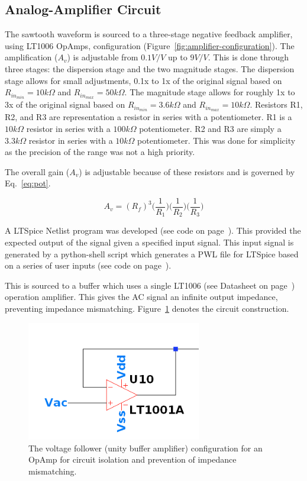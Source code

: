 \documentclass[12pt,journal]{IEEEtran}
\begin{document}
\subsection{Analog-Amplifier Circuit}

The sawtooth waveform is sourced to a three-stage negative feedback amplifier, using LT1006 OpAmps, configuration (Figure~\ref{fig:amplifier-configuration}). The amplification ($A_v$) is adjustable from $0.1 V/V$ up to $9 V/V$. This is done through three stages: the dispersion stage and the two magnitude stages. The dispersion stage allows for small adjustments, 0.1x to 1x of the original signal based on $R_{in_{min}} = 10k\Omega$ and $R_{in_{max}} = 50k\Omega$. The magnitude stage allows for roughly 1x to 3x of the original signal based on  $R_{in_{min}} = 3.6k\Omega$ and $R_{in_{max}} = 10k\Omega$. Resistors R1, R2, and R3 are representation a resistor in series with a potentiometer. R1 is a $10k\Omega$ resistor in series with a $100k\Omega$ potentiometer. R2 and R3 are simply a $3.3k\Omega$ resistor in series with a $10k\Omega$ potentiometer. This was done for simplicity as the precision of the range was not a high priority. 

The overall gain ($A_v$) is adjustable because of these resistors and is governed by Eq.~\ref{eq:pot}.

\begin{equation}
A_v = (R_f)^3\Big(\frac{1}{R_1}\Big)\Big(\frac{1}{R_2}\Big)\Big(\frac{1}{R_3}\Big)
\label{eq:pot}
\end{equation}

A LTSpice Netlist program was developed (see code on page~\pageref{code:ltspice-driver}). This provided the expected output of the signal given a specified input signal. This input signal is generated by a python-shell script which generates a PWL file for LTSpice based on a series of user inputs (see code on page~\pageref{code:pwl-ltspice-python}).

This is sourced to a buffer which uses a single LT1006 (see Datasheet on page~\pageref{datasheet:lt1006}) operation amplifier. This gives the AC signal an infinite output impedance, preventing impedance mismatching. Figure~\ref{fig:buffer} denotes the circuit construction.

\begin{figure}[h!]
  \centering
	\includegraphics[width=3in]{./ltspice/unity-buffer-ltspice.png}
	\caption[Cavity Mounts]{The voltage follower (unity buffer amplifier) configuration for an OpAmp for circuit isolation and prevention of impedance mismatching.}
	\label{fig:buffer}
\end{figure}  
\end{document}
